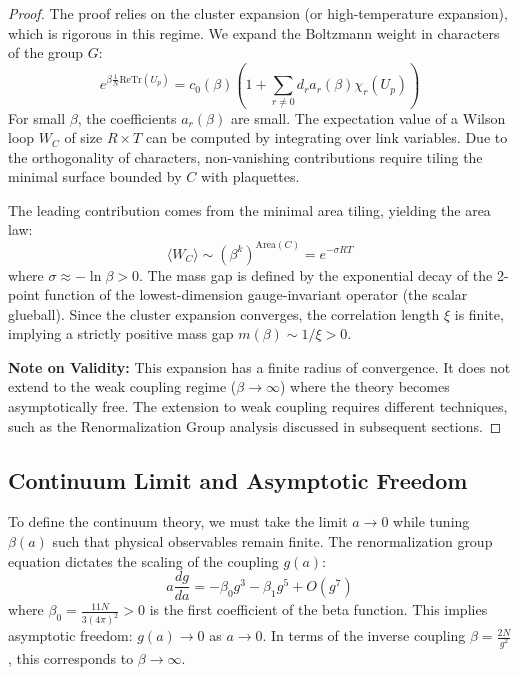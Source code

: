\begin{proof}
    The proof relies on the cluster expansion (or high-temperature expansion), which is rigorous in this regime. We expand the Boltzmann weight in characters of the group $G$:
    \begin{equation}
        e^{\beta \frac{1}{N} \text{Re} \text{Tr}(U_p)} = c_0(\beta) \left( 1 + \sum_{r \neq 0} d_r a_r(\beta) \chi_r(U_p) \right)
    \end{equation}
    For small $\beta$, the coefficients $a_r(\beta)$ are small. The expectation value of a Wilson loop $W_C$ of size $R \times T$ can be computed by integrating over link variables. Due to the orthogonality of characters, non-vanishing contributions require tiling the minimal surface bounded by $C$ with plaquettes.
    
    The leading contribution comes from the minimal area tiling, yielding the area law:
    \begin{equation}
        \langle W_C \rangle \sim (\beta^k)^{\text{Area}(C)} = e^{-\sigma R T}
    \end{equation}
    where $\sigma \approx - \ln \beta > 0$. The mass gap is defined by the exponential decay of the 2-point function of the lowest-dimension gauge-invariant operator (the scalar glueball). Since the cluster expansion converges, the correlation length $\xi$ is finite, implying a strictly positive mass gap $m(\beta) \sim 1/\xi > 0$.
    
    \textbf{Note on Validity:} This expansion has a finite radius of convergence. It does not extend to the weak coupling regime ($\beta \to \infty$) where the theory becomes asymptotically free. The extension to weak coupling requires different techniques, such as the Renormalization Group analysis discussed in subsequent sections.
\end{proof}

\subsection{Continuum Limit and Asymptotic Freedom}
\label{sec:continuum-limit}

To define the continuum theory, we must take the limit $a \to 0$ while tuning $\beta(a)$ such that physical observables remain finite. The renormalization group equation dictates the scaling of the coupling $g(a)$:
\begin{equation}
    a \frac{dg}{da} = -\beta_0 g^3 - \beta_1 g^5 + O(g^7)
\end{equation}
where $\beta_0 = \frac{11N}{3(4\pi)^2} > 0$ is the first coefficient of the beta function. This implies asymptotic freedom: $g(a) \to 0$ as $a \to 0$.
In terms of the inverse coupling $\beta = \frac{2N}{g^2}$, this corresponds to $\beta \to \infty$.

